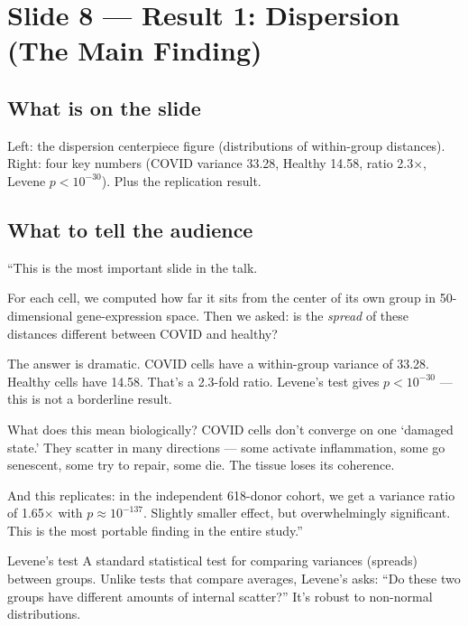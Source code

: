 \documentclass[11pt]{article}
\begin{document}
\section{Slide 8 --- Result 1: Dispersion (The Main Finding)}

\subsection{What is on the slide}

Left: the dispersion centerpiece figure (distributions of within-group distances). Right: four key numbers (COVID variance 33.28, Healthy 14.58, ratio 2.3$\times$, Levene $p < 10^{-30}$). Plus the replication result.

\subsection{What to tell the audience}

\begin{speaknote}
``This is the most important slide in the talk.

For each cell, we computed how far it sits from the center of its own group in 50-dimensional gene-expression space. Then we asked: is the \emph{spread} of these distances different between COVID and healthy?

The answer is dramatic. COVID cells have a within-group variance of 33.28. Healthy cells have 14.58. That's a 2.3-fold ratio. Levene's test gives $p < 10^{-30}$ --- this is not a borderline result.

What does this mean biologically? COVID cells don't converge on one `damaged state.' They scatter in many directions --- some activate inflammation, some go senescent, some try to repair, some die. The tissue loses its coherence.

And this replicates: in the independent 618-donor cohort, we get a variance ratio of 1.65$\times$ with $p \approx 10^{-137}$. Slightly smaller effect, but overwhelmingly significant. This is the most portable finding in the entire study.''
\end{speaknote}

\begin{jargon}{Levene's test}
A standard statistical test for comparing variances (spreads) between groups. Unlike tests that compare averages, Levene's asks: ``Do these two groups have different amounts of internal scatter?'' It's robust to non-normal distributions.
\end{jargon}
\end{document}
